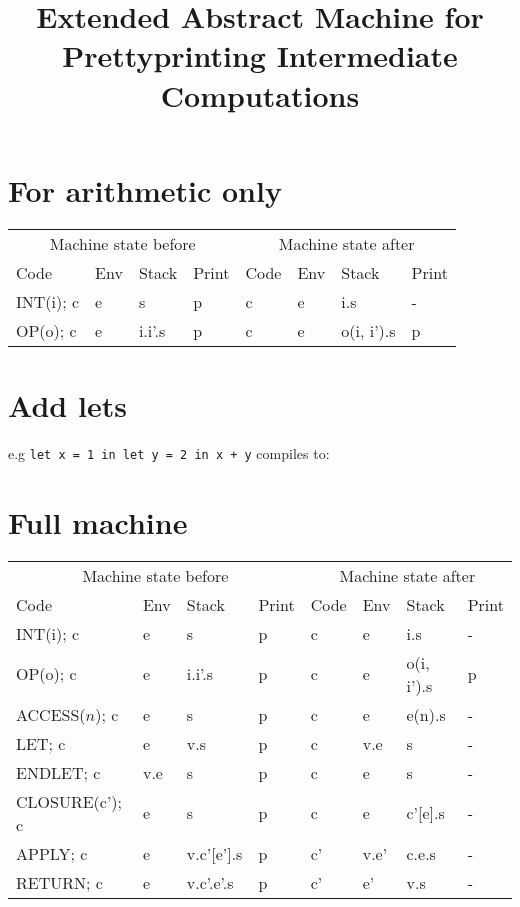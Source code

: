 \documentclass[11pt]{article}
\begin{document}
\title{Extended Abstract Machine for Prettyprinting Intermediate Computations}
\maketitle

\section{For arithmetic only}
\begin{tabular}{l|l|l|l||l|l|l|l}
\multicolumn{4}{c}{Machine state before}&
\multicolumn{4}{c}{Machine state after}\\
Code & Env & Stack & Print & Code & Env & Stack & Print\\
INT(i); c & e & s & p & c & e & i.s & -\\
OP(o); c & e & i.i'.s & p & c & e & o(i, i').s & p\\
\end{tabular}

\section{Add lets}

e.g \texttt{let x = 1 in let y = 2 in x + y} compiles to:



\section{Full machine}

\begin{tabular}{l|l|l|l||l|l|l|l}
\multicolumn{4}{c}{Machine state before}&
\multicolumn{4}{c}{Machine state after}\\
Code & Env & Stack & Print & Code & Env & Stack & Print\\
INT(i); c & e & s & p & c & e & i.s & -\\
OP(o); c & e & i.i'.s & p & c & e & o(i, i').s & p\\
ACCESS($n$); c & e & s & p & c & e & e(n).s & - \\
LET; c & e & v.s & p & c & v.e & s & -\\
ENDLET; c & v.e & s & p & c & e & s & -\\
CLOSURE(c'); c & e & s & p & c & e & c'[e].s & -\\
APPLY; c & e & v.c'[e'].s & p & c' & v.e' & c.e.s & -\\
RETURN; c & e & v.c'.e'.s & p & c' & e' & v.s & -\\
\end{tabular}
\end{document}
